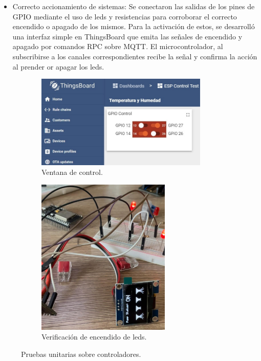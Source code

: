 \begin{itemize} 
\item Correcto accionamiento de sistemas: Se conectaron las salidas de los pines de GPIO mediante el uso de leds y resistencias para corroborar el correcto encendido o apagado de los mismos. Para la activación de estos, se desarrolló una interfaz simple en ThingsBoard que emita las señales de encendido y apagado por comandos RPC sobre MQTT. El microcontrolador, al subscribirse a los canales correspondientes recibe la señal y confirma la acción al prender or apagar los leds.
\end{itemize}


\begin{figure}[htpb]
     \centering
       \begin{subfigure}[b]{0.45\textwidth}
	    \centering
		 \includegraphics[width=0.9\textwidth]{./Figures/chapter4/control_unit_test_1.jpg}
		\caption{Ventana de control.}
		\label{fig:control_test1}
     \end{subfigure}
          \hfill
     \begin{subfigure}[b]{0.45\textwidth}
		\centering
		\includegraphics[width=0.70\textwidth]{./Figures/chapter4/control_test.jpg}
		\caption{Verificación de encendido de leds.}
		\label{fig:control_test1}
     \end{subfigure}
     \hfill
        \caption[Pruebas unitarias sobre controladores]{Pruebas unitarias sobre controladores.}
        \label{fig:control_test}
\end{figure}


